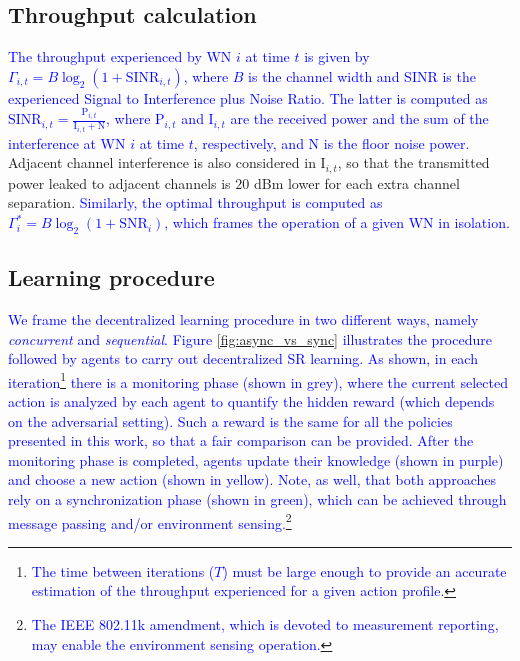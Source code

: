 \documentclass[preprint,12pt]{elsarticle}
\begin{document}
	\subsection{Throughput calculation}
	\label{section:throughput_calculation}
	\textcolor{blue}{The throughput experienced by WN $i$ at time $t$ is given by $\Gamma_{i,t} = B  \log_{2}(1 + \text{SINR}_{i, t})$,
		where $B$ is the channel width and SINR is the experienced Signal to Interference plus Noise Ratio. The latter is computed as $\text{SINR}_{i,t} = \frac{\text{P}_{i,t}}{\text{I}_{i,t}+\text{N}}$,
		where $\text{P}_{i,t}$ and $\text{I}_{i,t}$ are the received power and the sum of the interference at WN $i$ at time $t$, respectively, and N is the floor noise power.} Adjacent channel interference is also considered in $\text{I}_{i,t}$, so that the transmitted power leaked to adjacent channels is $20$ dBm lower for each extra channel separation. \textcolor{blue}{Similarly, the optimal throughput is computed as $\Gamma_{i}^* = B  \log_{2}(1 + \text{SNR}_{i})$, which frames the operation of a given WN in isolation.}
	
	\subsection{Learning procedure}
	\label{section:learning_procedure}
	
	\textcolor{blue}{We frame the decentralized learning procedure in two different ways, namely \textit{concurrent} and \textit{sequential}. Figure \ref{fig:async_vs_sync} illustrates the procedure followed by agents to carry out decentralized SR learning. As shown, in each iteration\footnote{\textcolor{blue}{The time between iterations ($T$) must be large enough to provide an accurate estimation of the throughput experienced for a given action profile.}} there is a monitoring phase (shown in grey), where the current selected action is analyzed by each agent to quantify the hidden reward (which depends on the adversarial setting). Such a reward is the same for all the policies presented in this work, so that a fair comparison can be provided. After the monitoring phase is completed, agents update their knowledge (shown in purple) and choose a new action (shown in yellow). Note, as well, that both approaches rely on a synchronization phase (shown in green), which can be achieved  through message passing \cite{sanghavi2009message, yang2011message} and/or environment sensing.\footnote{\textcolor{blue}{The IEEE 802.11k amendment, which is devoted to measurement reporting, may enable the environment sensing operation.}}} 
	
\end{document}
